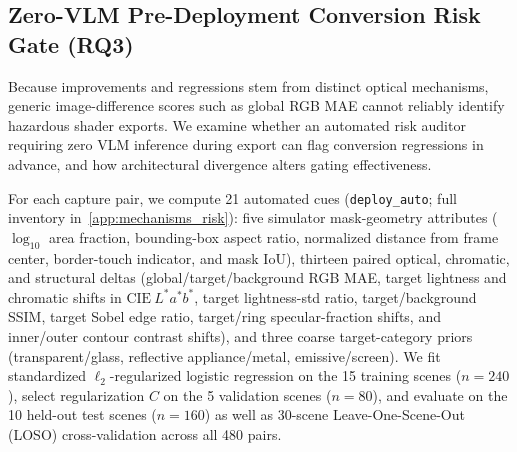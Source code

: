 \subsection{Zero-\textsc{VLM} Pre-Deployment Conversion Risk Gate (\textbf{RQ3})}
\label{sec:risk_gate}

Because improvements and regressions stem from distinct optical mechanisms, generic image-difference scores such as global \textsc{RGB MAE} cannot reliably identify hazardous shader exports. We examine whether an automated risk auditor requiring zero \textsc{VLM} inference during export can flag conversion regressions in advance, and how architectural divergence alters gating effectiveness.

For each capture pair, we compute 21 automated cues (\texttt{deploy\_auto}; full inventory in~\ref{app:mechanisms_risk}): five simulator mask-geometry attributes ($\log_{10}$ area fraction, bounding-box aspect ratio, normalized distance from frame center, border-touch indicator, and mask $\mathrm{IoU}$), thirteen paired optical, chromatic, and structural deltas (global/target/background \textsc{RGB MAE}, target lightness and chromatic shifts in $\mathrm{CIE}~L^*a^*b^*$, target lightness-std ratio, target/background \textsc{SSIM}, target Sobel edge ratio, target/ring specular-fraction shifts, and inner/outer contour contrast shifts), and three coarse target-category priors (transparent/glass, reflective appliance/metal, emissive/screen). We fit standardized $\ell_2$-regularized logistic regression on the 15 training scenes ($n{=}240$), select regularization $C$ on the 5 validation scenes ($n{=}80$), and evaluate on the 10 held-out test scenes ($n{=}160$) as well as 30-scene Leave-One-Scene-Out (\textsc{LOSO}) cross-validation across all 480 pairs.

\begin{table}[!t]
\centering\scriptsize
\resizebox{\textwidth}{!}{}
\caption{Zero-\textsc{VLM} pre-deployment conversion risk gating on held-out test scenes ($n{=}160$) and 30-scene \textsc{LOSO} ($n{=}480$). Geometry and paired structural features predict family-specific regressions (\textsc{AUROC} $0.743$ test / $0.732$ \textsc{LOSO}) where global \textsc{RGB MAE} ($0.432$) and undirected \emph{Flip} ($0.501$) fail, whereas pooling heterogeneous losses across all six checkpoints dilutes gating accuracy ($0.582$).}
\label{tab:risk_gate}
\end{table}

